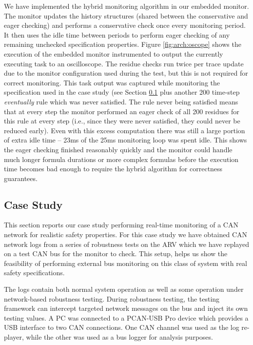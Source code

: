 We have implemented the hybrid monitoring algorithm in our embedded monitor. The monitor updates the history structures (shared between the conservative and eager checking) and performs a conservative check once every monitoring period. It then uses the idle time between periods to perform eager checking of any remaining unchecked specification properties.
%
Figure \ref{fig:arch:oscope} shows the execution of the embedded monitor instrumented to output the currently executing task to an oscilloscope. The residue checks run twice per trace update due to the monitor configuration used during the test, but this is not required for correct monitoring.
This task output was captured while monitoring the specification used in the case study (see Section \ref{sec:case_study} plus another 200 time-step \emph{eventually} rule which was never satisfied. 
The rule never being satisfied means that at every step the monitor performed an eager check of all 200 residues for this rule at every step (i.e., since they were never satisfied, they could never be reduced early). 
Even with this excess computation there was still a large portion of extra idle time -- 23ms of the 25ms monitoring loop was spent idle. 
This shows the eager checking finished reasonably quickly and the monitor could handle much longer formula durations or more complex formulas before the execution time becomes bad enough to require the hybrid algorithm for correctness guarantees. 

\subsection{Case Study}
\label{sec:case_study}
This section reports our case study performing real-time monitoring of a CAN network for realistic safety properties. 
For this case study we have obtained CAN network logs from a series of robustness tests on the ARV which we have replayed on a test CAN bus for the monitor to check. 
This setup, %
helps us show the feasibility of performing external bus monitoring on this class of system with real safety specifications.


The logs contain both normal system operation as well as some operation under network-based robustness testing. During robustness testing, the testing framework can intercept targeted network messages on the bus and inject its own testing values. %
A PC was connected to a PCAN-USB Pro \cite{PCAN-USBPro} device which provides a USB interface to two CAN connections. One CAN channel was used as the log re-player, while the other was used as a bus logger for analysis purposes.

